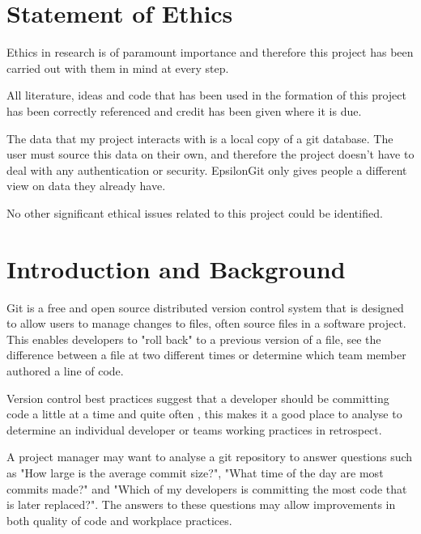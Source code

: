 \documentclass[11pt]{book}
\begin{document}
\section{Statement of Ethics}
Ethics in research is of paramount importance and therefore this project has been carried out with them in mind at every step. 

All literature, ideas and code that has been used in the formation of this project has been correctly referenced and credit has been given where it is due.

The data that my project interacts with is a local copy of a git database. The user must source this data on their own, and therefore the project doesn't have to deal with any authentication or security. EpsilonGit only gives people a different view on data they already have.

No other significant ethical issues related to this project could be identified.

\clearpage

\section{Introduction and Background}
	
Git is a free and open source distributed version control system \cite{gitintro} that is designed to allow users to manage changes to files, often source files in a software project. This enables developers to "roll back" to a previous version of a file, see the difference between a file at two different times or determine which team member authored a line of code. 

Version control best practices suggest that a developer should be committing code a little at a time and quite often \cite{gitbestpractices}, this makes it a good place to analyse to determine an individual developer or teams working practices in retrospect.

A project manager may want to analyse a git repository to answer questions such as "How large is the average commit size?", "What time of the day are most commits made?" and "Which of my developers is committing the most code that is later replaced?". The answers to these questions may allow improvements in both quality of code and workplace practices.
\end{document}

